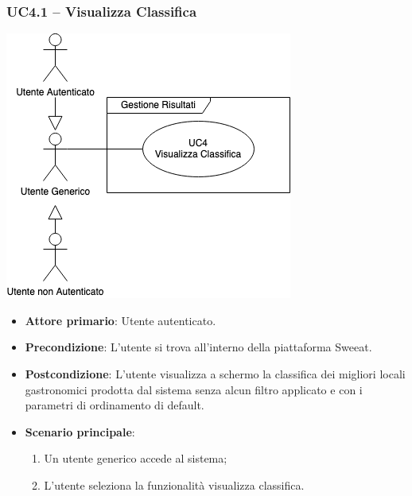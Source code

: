\subsubsection{UC4.1 – Visualizza Classifica}
\begin{center}
\includegraphics[scale=0.5]{UC_images/UC4-2.png}
\end{center}
\begin{itemize}
    \item \textbf{Attore primario}: Utente autenticato.
    \item \textbf{Precondizione}: L’utente si trova all’interno della piattaforma Sweeat.
    \item \textbf{Postcondizione}: L’utente visualizza a schermo la classifica dei migliori locali gastronomici prodotta dal sistema senza alcun filtro applicato e con i parametri di ordinamento di default.
    \item \textbf{Scenario principale}: 
    \begin{enumerate}
        \item Un utente generico accede al sistema;
        \item L’utente seleziona la funzionalità visualizza classifica.
    \end{enumerate}
\end{itemize}

